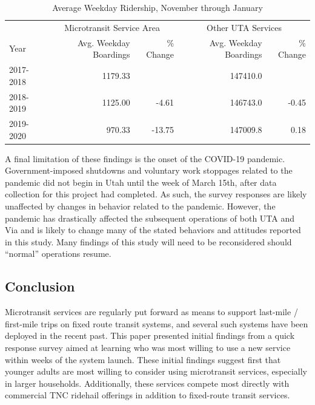 \documentclass[smartcities,article,submit,moreauthors,pdftex]{Definitions/mdpi}
\begin{document}
\begin{table}[ht]
    \centering
    \caption{Average Weekday Ridership, November through January}
    \label{tab:uta-ridership}
    \begin{tabular}[t]{lrrrr}
\toprule
\multicolumn{1}{c}{ } & \multicolumn{2}{c}{Microtransit Service Area} & \multicolumn{2}{c}{Other UTA Services} \\
\cmidrule(l{3pt}r{3pt}){2-3} \cmidrule(l{3pt}r{3pt}){4-5}
Year & Avg. Weekday Boardings & \% Change & Avg. Weekday Boardings & \% Change\\
\midrule
2017-2018 & 1179.33 &  & 147410.0 & \\
2018-2019 & 1125.00 & -4.61 & 146743.0 & -0.45\\
2019-2020 & 970.33 & -13.75 & 147009.8 & 0.18\\
\bottomrule
\end{tabular}
\end{table}

A final limitation of these findings is the onset of the COVID-19 pandemic. Government-imposed shutdowns and voluntary work stoppages related to the pandemic did not begin in Utah until the week of March 15th, after data collection for this project had completed. As such, the survey responses are likely unaffected by changes in behavior related to the pandemic. However, the pandemic has drastically affected the subsequent operations of both UTA and Via and is likely to change many of the stated behaviors and attitudes reported in this study. Many findings of this study will need to be reconsidered should “normal” operations resume.

\subsection{Conclusion}

Microtransit services are regularly put forward as means to support last-mile / first-mile trips on fixed route transit systems, and several such systems have been deployed in the recent past. This paper presented initial findings from a quick response survey aimed at learning who was most willing to use a new service within weeks of the system launch. These initial findings suggest first that younger adults are most willing to consider using microtransit services, especially in larger households. Additionally, these services compete most directly with commercial TNC ridehail offerings in addition to fixed-route transit services.
\end{document}
